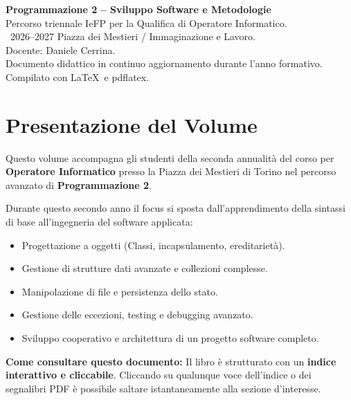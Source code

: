 \documentclass[11pt,a4paper,openany]{book}
\begin{document}
\thispagestyle{empty}
\vspace*{12cm}
\begin{flushleft}
  \small\color{PiazzaGray}
  \textbf{Programmazione 2 -- Sviluppo Software e Metodologie}\\
  Percorso triennale IeFP per la Qualifica di Operatore Informatico.\\
  \textcopyright~2026--2027 Piazza dei Mestieri / Immaginazione e Lavoro.\\
  Docente: Daniele Cerrina.\\
  \vspace{0.8em}
  Documento didattico in continuo aggiornamento durante l'anno formativo.\\
  Compilato con \LaTeX\ e \textsf{pdflatex}.
\end{flushleft}

\clearpage

\chapter*{Presentazione del Volume}

Questo volume accompagna gli studenti della seconda annualità del corso per \textbf{Operatore Informatico} presso la Piazza dei Mestieri di Torino nel percorso avanzato di \textbf{Programmazione 2}.

Durante questo secondo anno il focus si sposta dall'apprendimento della sintassi di base all'ingegneria del software applicata:
\begin{itemize}
  \item Progettazione a oggetti (Classi, incapsulamento, ereditarietà).
  \item Gestione di strutture dati avanzate e collezioni complesse.
  \item Manipolazione di file e persistenza dello stato.
  \item Gestione delle eccezioni, testing e debugging avanzato.
  \item Sviluppo cooperativo e architettura di un progetto software completo.
\end{itemize}

\vspace{1em}
\noindent\textbf{Come consultare questo documento:}
Il libro è strutturato con un \textbf{indice interattivo e cliccabile}. Cliccando su qualunque voce dell'indice o dei segnalibri PDF è possibile saltare istantaneamente alla sezione d'interesse.
\end{document}
